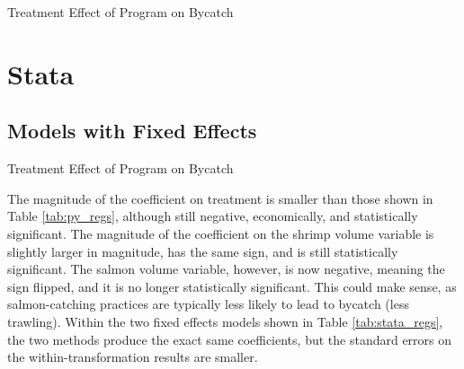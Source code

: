 \documentclass{article}
\begin{document}
\vspace{-0.2cm}

\begin{table}[ht]
\centering
\caption{Treatment Effect of Program on Bycatch}
\vspace{0.3cm}
\begin{threeparttable}

\end{threeparttable}  
\label{tab:py_regs}
\end{table}

\vspace{-0.4cm}

\section{Stata}

\subsection{Models with Fixed Effects}
\vspace{-0.4cm}
\begin{table}[ht]
\centering
\caption{Treatment Effect of Program on Bycatch}
\vspace{0.3cm}
\begin{threeparttable}

\end{threeparttable}  
\label{tab:stata_regs}
\end{table}

The magnitude of the coefficient on treatment is smaller than those shown in Table \ref{tab:py_regs}, although still negative, economically, and statistically significant. The magnitude of the coefficient on the shrimp volume variable is slightly larger in magnitude, has the same sign, and is still statistically significant. The salmon volume variable, however, is now negative, meaning the sign flipped, and it is no longer statistically significant. This could make sense, as salmon-catching practices are typically less likely to lead to bycatch (less trawling). Within the two fixed effects models shown in Table \ref{tab:stata_regs}, the two methods produce the exact same coefficients, but the standard errors on the within-transformation results are smaller. 
\end{document}
